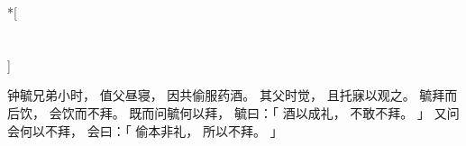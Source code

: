 
\switchcolumn[0]*[\section{}]

钟毓兄弟小时，
值父昼寝，
因共偷服药酒。
其父时觉，
且托寐以观之。
毓拜而后饮，
会饮而不拜。
既而问毓何以拜，
毓曰：「
    酒以成礼，
    不敢不拜。
」
又问会何以不拜，
会曰：「
    偷本非礼，
    所以不拜。
」

\switchcolumn



